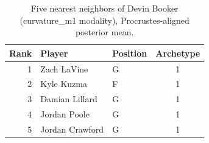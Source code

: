 \begin{table}[htbp]
  \centering\small
  \begin{tabular}{rllc}
    \toprule
    Rank & Player & Position & Archetype \\
    \midrule
    1 & Zach LaVine & G & 1 \\
    2 & Kyle Kuzma & F & 1 \\
    3 & Damian Lillard & G & 1 \\
    4 & Jordan Poole & G & 1 \\
    5 & Jordan Crawford & G & 1 \\
    \bottomrule
  \end{tabular}
  \caption{Five nearest neighbors of Devin Booker (curvature_m1 modality), Procrustes-aligned posterior mean.}
  \label{tab:Devin_Booker_neighbors_curvature_m1}
\end{table}

